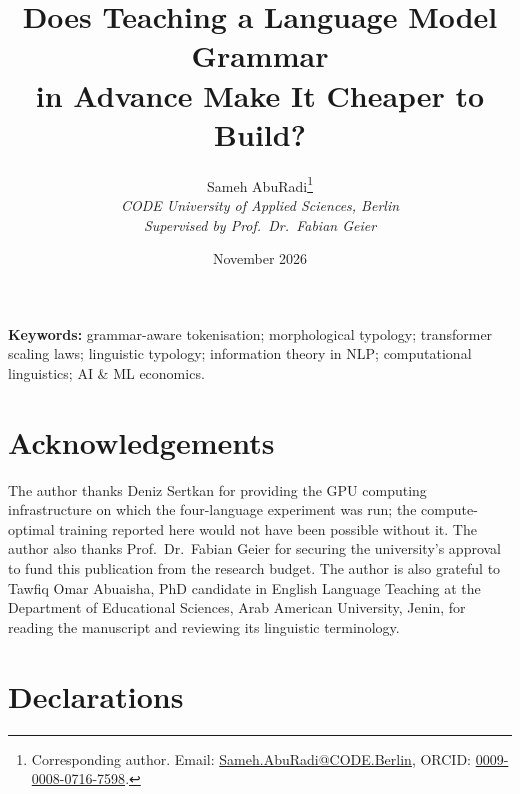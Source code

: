 \documentclass[11pt, a4paper]{article}
\title{%
Does Teaching a Language Model Grammar\\
in Advance Make It Cheaper to Build?
}
\author{%
Sameh AbuRadi\thanks{Corresponding author. Email: \href{mailto:Sameh.AbuRadi@CODE.Berlin}{Sameh.AbuRadi@CODE.Berlin}, ORCID: \href{https://orcid.org/0009-0008-0716-7598}{0009-0008-0716-7598}.} \\
\textit{CODE University of Applied Sciences, Berlin} \\
\textit{Supervised by Prof.\ Dr.\ Fabian Geier}
}
\date{November 2026}
\begin{document}
\maketitle



\vspace{6pt}
\noindent\textbf{Keywords:} grammar-aware tokenisation; morphological typology; transformer scaling laws; linguistic typology; information theory in NLP; computational linguistics; AI \& ML economics.

\vspace{12pt}












\section*{Acknowledgements}
The author thanks Deniz Sertkan for providing the GPU computing infrastructure on which the four-language experiment was run; the compute-optimal training reported here would not have been possible without it. The author also thanks Prof.\ Dr.\ Fabian Geier for securing the university's approval to fund this publication from the research budget. The author is also grateful to Tawfiq Omar Abuaisha, PhD candidate in English Language Teaching at the Department of Educational Sciences, Arab American University, Jenin, for reading the manuscript and reviewing its linguistic terminology.


\section*{Declarations}
\end{document}
